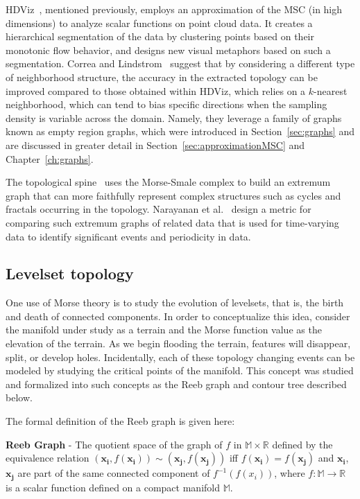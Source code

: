 HDViz~\cite{GerberBremerPascucci2010}, mentioned previously, employs an approximation of the MSC (in high dimensions) to analyze scalar functions on point cloud data.
%
It creates a hierarchical segmentation of the data by clustering points based on their monotonic flow behavior, and designs new visual metaphors based on such a segmentation.
%
Correa and Lindstrom~\cite{CorreaLindstrom2011} suggest that by considering a different type of neighborhood structure, the accuracy in the extracted topology can be improved compared to those obtained within HDViz, which relies on a $k$-nearest neighborhood, which can tend to bias specific directions when the sampling density is variable across the domain.
%
Namely, they leverage a family of graphs known as empty region graphs, which were introduced in Section~\ref{sec:graphs} and are discussed in greater detail in Section~\ref{sec:approximationMSC} and Chapter~\ref{ch:graphs}.
%

The topological spine~\cite{CorreaLindstromBremer2011} uses the Morse-Smale complex to build an extremum graph that can more faithfully represent complex structures such as cycles and fractals occurring in the topology.
%
Narayanan et al.~\cite{NarayananThomasNatarajan2015} design a metric for comparing such extremum graphs of related data that is used for time-varying data to identify significant events and periodicity in data.

\subsection{Levelset topology}

One use of Morse theory is to study the evolution of levelsets, that is, the birth and death of connected components.
%
In order to conceptualize this idea, consider the manifold under study as a terrain and the Morse function value as the elevation of the terrain.
%
As we begin flooding the terrain, features will disappear, split, or develop holes.
%
Incidentally, each of these topology changing events can be modeled by studying the critical points of the manifold.
%
This concept was studied and formalized into such concepts as the Reeb graph and contour tree described below.

The formal definition of the Reeb graph is given here:

\begin{defn}
\textbf{Reeb Graph} - The quotient space of the graph of $f$ in
$\mathbb{M} \times \mathbb{R}$ defined by the equivalence relation
$(\mathbf{x_i},f(\mathbf{x_i})) \sim (\mathbf{x_j},f(\mathbf{x_j}))$ iff
$f(\mathbf{x_i}) = f(\mathbf{x_j})$ and $\mathbf{x_i}$,$\mathbf{x_j}$ are part
of the same connected component of $f^{-1}(f(x_i))$, where $f : \mathbb{M} \rightarrow \mathbb{R}$ is a scalar function defined on a compact manifold $\mathbb{M}$.
\end{defn}

